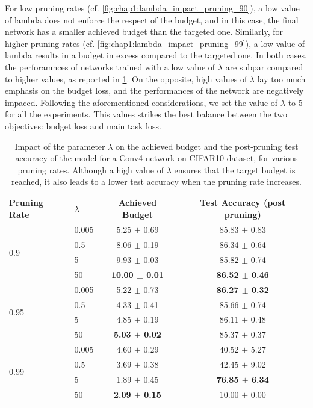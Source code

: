 For low pruning rates (cf. \cref{fig:chap1:lambda_impact_pruning_90}), a low
value of lambda does not enforce the respect of the budget, and in this case,
the final network has a smaller achieved budget than the targeted one.
Similarly, for higher pruning rates (cf. \cref{fig:chap1:lambda_impact_pruning_99}), a low value of lambda results in a budget
in excess compared to the targeted one. In both cases, the perforamnces
of networks trained with a low value of $\lambda$ are subpar compared to higher
values, as reported in \cref{tab:chap1:lambda_impact}. On the opposite, high
values of $\lambda$ lay too much emphasis on the budget loss, and the
performances of the network are negatively impaced. Following the aforementioned
considerations, we set the value of $\lambda$ to 5 for all the experiments. This
values strikes the best balance between the two objectives: budget loss and main
task loss.


\begin{table}[tbp]
  \centering
  \begin{center}
    \begin{tabular}{llcc}
      \toprule
      Pruning Rate & $\lambda$ & Achieved Budget & Test Accuracy (post pruning) \\
      \midrule
      \multirow{4}{*}{0.9} & 0.005 & 5.25 $\pm$ 0.69 & 85.83 $\pm$ 0.83 \\
      & 0.5 & 8.06 $\pm$ 0.19 & 86.34 $\pm$ 0.64 \\
      & 5 & 9.93 $\pm$ 0.03 & 85.82 $\pm$ 0.74 \\
      & 50 & \textbf{10.00 $\pm$ 0.01} & \textbf{86.52 $\pm$ 0.46} \\
      \midrule
      \multirow{4}{*}{0.95} & 0.005 & 5.22 $\pm$ 0.73 & \textbf{86.27 $\pm$ 0.32} \\
      & 0.5 & 4.33 $\pm$ 0.41 & 85.66 $\pm$ 0.74 \\
      & 5 & 4.85 $\pm$ 0.19 & 86.11 $\pm$ 0.48 \\
      & 50 & \textbf{5.03 $\pm$ 0.02} & 85.37 $\pm$ 0.37 \\
      \midrule
      \multirow{4}{*}{0.99} & 0.005 & 4.60 $\pm$ 0.29 & 40.52 $\pm$ 5.27 \\
      & 0.5 & 3.69 $\pm$ 0.38 & 42.45 $\pm$ 9.02 \\
      & 5 & 1.89 $\pm$ 0.45 & \textbf{76.85 $\pm$ 6.34} \\
      & 50 & \textbf{2.09 $\pm$ 0.15} & 10.00 $\pm$ 0.00 \\
      \bottomrule
    \end{tabular}
  \end{center}
  \caption{\centering
    Impact of the parameter $\lambda$ on the achieved budget and the post-pruning test accuracy of the model for a Conv4 network on CIFAR10 dataset,
    for various pruning rates. Although a high value of $\lambda$ ensures that
    the target budget is reached, it also leads to a lower test accuracy when
    the pruning rate increases.}
    \label{tab:chap1:lambda_impact}
\end{table}



